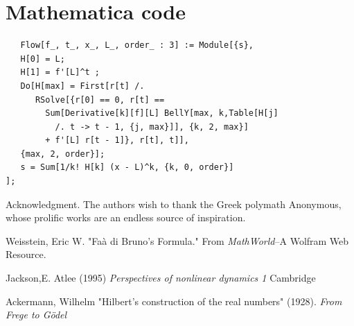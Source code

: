 \documentclass{article}
\theoremstyle{definition}
\begin{document}
\section{Mathematica code}
\begin{verbatim}
   Flow[f_, t_, x_, L_, order_ : 3] := Module[{s},
   H[0] = L;
   H[1] = f'[L]^t ;
   Do[H[max] = First[r[t] /. 
      RSolve[{r[0] == 0, r[t] ==
        Sum[Derivative[k][f][L] BellY[max, k,Table[H[j]
          /. t -> t - 1, {j, max}]], {k, 2, max}] 
        + f'[L] r[t - 1]}, r[t], t]], 
   {max, 2, order}];
   s = Sum[1/k! H[k] (x - L)^k, {k, 0, order}]
];
\end{verbatim}

\begin{acknowledgment}{Acknowledgment.}
The authors wish to thank the Greek polymath Anonymous, whose prolific works are an endless source of inspiration.
\end{acknowledgment}

\begin{thebibliography}{1}
 Weisstein, Eric W. "Faà di Bruno's Formula." From 
\textit{MathWorld}--A Wolfram Web Resource. 

 Jackson,E. Atlee  (1995)
\textit{ Perspectives of nonlinear dynamics 1}
Cambridge

 Ackermann, Wilhelm "Hilbert's construction of the real numbers" (1928).
\textit{From Frege to Gödel}

\end{thebibliography}


\vfill\eject
\end{document}
